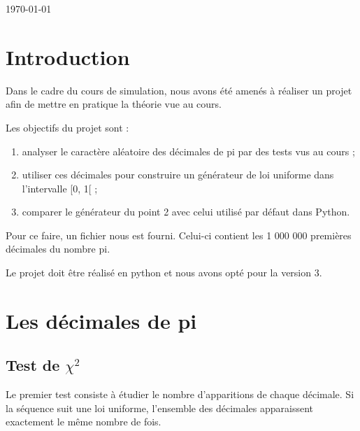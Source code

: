 \documentclass[10pt,a4paper]{article}
\begin{document}
\begin{titlepage}
\begin{sffamily}
\begin{center}
				\vfill
				
				{\large \today}
				
			\end{center}
		\end{sffamily}
	\end{titlepage}
	
	\newpage
	\tableofcontents
	
	\newpage
	\section{Introduction}
	Dans le cadre du cours de simulation, nous avons été amenés à réaliser un projet afin de mettre en pratique la théorie vue au cours.
	
	Les objectifs du projet sont :
	\begin{enumerate}
		\item analyser le caractère aléatoire des décimales de pi par des tests vus au cours ;
		\item utiliser ces décimales pour construire un générateur de loi uniforme dans l'intervalle [0, 1[ ;
		\item comparer le générateur du point 2 avec celui utilisé par défaut dans Python.
	\end{enumerate}
	
	Pour ce faire, un fichier nous est fourni. Celui-ci contient les 1 000 000 premières décimales du nombre pi.
	
	Le projet doit être réalisé en python et nous avons opté pour la version 3.
	
	\newpage
	\section{Les décimales de pi}
	
	\subsection{Test de $\chi^2$}
	Le premier test consiste à étudier le nombre d'apparitions de chaque décimale. Si la séquence suit une loi uniforme, l'ensemble des décimales apparaissent exactement le même nombre de fois.
	
\end{document}
